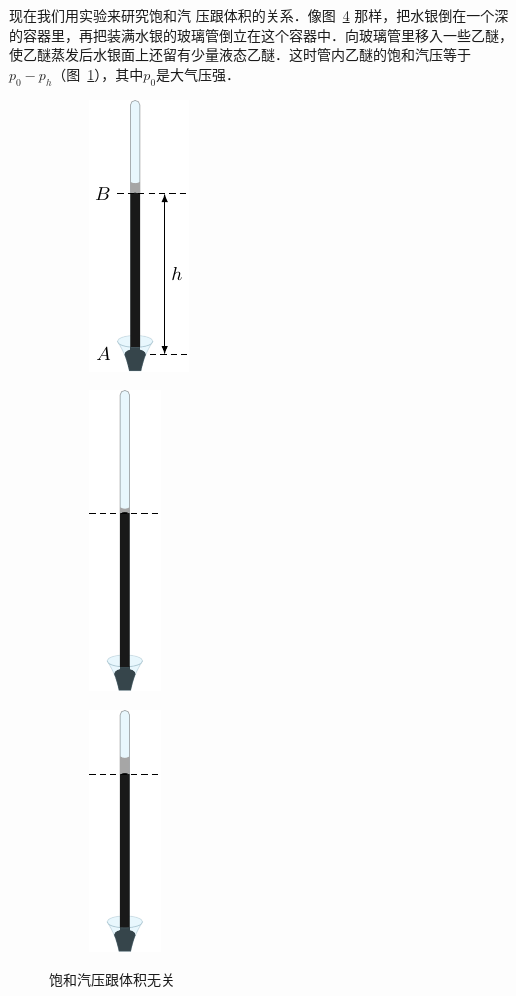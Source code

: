 现在我们用实验来研究饱和汽
压跟体积的关系．像图~\ref{fig_B_5-5} 那样，把水银倒在一个深的容器里，再把装满水银的玻璃管倒立在这个容器中．向玻璃管里移入一些乙醚，使乙醚蒸发后水银面上还留有少量液态乙醚．这时管内乙醚的饱和汽压等于$p_0-p_h$（图~\ref{fig_B_5-5a}），其中$p_0$是大气压强．
\begin{figure}[htbp]
    \centering
    \begin{subfigure}{0.3\linewidth}
        \centering
        \includegraphics{fig/B/5-5a.pdf}
        \caption{}\label{fig_B_5-5a}
    \end{subfigure}
    \hfil
    \begin{subfigure}{0.3\linewidth}
        \centering
        \includegraphics{fig/B/5-5b.pdf}
        \caption{}\label{fig_B_5-5b}
    \end{subfigure}
    \hfil
    \begin{subfigure}{0.3\linewidth}
        \centering
        \includegraphics{fig/B/5-5c.pdf}
        \caption{}\label{fig_B_5-5c}
    \end{subfigure}
    \caption{饱和汽压跟体积无关}\label{fig_B_5-5}
\end{figure}

